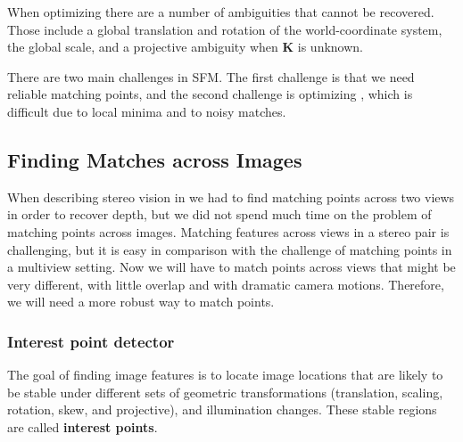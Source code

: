 When optimizing \eqn{\ref{eq:final_reprojection_error}} there are a number of ambiguities that cannot be recovered. Those include a global translation and rotation of the world-coordinate system, the global scale, and a projective ambiguity when $\mathbf{K}$ is unknown. 



There are two main challenges in SFM. The first challenge is that we need reliable matching points, and the second challenge is optimizing \eqn{\ref{eq:final_reprojection_error}}, which is difficult due to local minima and to noisy matches. 


\subsection{Finding Matches across Images}

When describing stereo vision in \chap{\ref{chap:stereo_vision}} we had to find matching points across two views in order to recover depth, but we did not spend much time on the problem of matching points across images. Matching features across views in a stereo pair is challenging, but it is easy in comparison with the challenge of matching points in a multiview setting. Now we will have to match points across views that might be very different, with little overlap and with dramatic camera motions. Therefore, we will need a more robust way to match points. 


\subsubsection{Interest point detector}

The goal of finding image features is to locate image locations that are likely to be stable under different sets of geometric transformations (translation, scaling, rotation, skew, and projective), and illumination changes. These stable regions are called {\bf interest points}. 

